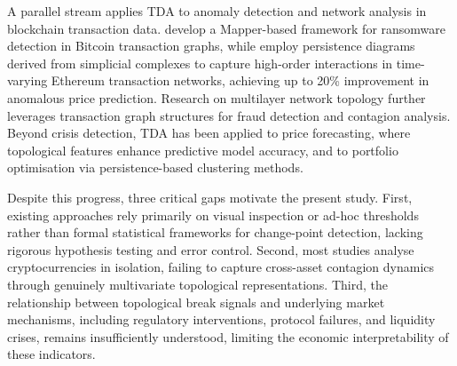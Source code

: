 \documentclass[11pt,reqno]{amsart}
\numberwithin{equation}{section} %
\begin{document}
A parallel stream applies TDA to anomaly detection and network analysis in blockchain transaction data. 
\citet{akcora2019bitcoinheist} develop a Mapper-based framework for ransomware detection in Bitcoin transaction graphs, while \citet{islambekov2024topological} employ persistence diagrams derived from simplicial complexes to capture high-order interactions in time-varying Ethereum transaction networks, achieving up to 20\% improvement in anomalous price prediction. 
Research on multilayer network topology further leverages transaction graph structures for fraud detection and contagion analysis\cite{li2020dissecting, ofori2021topological}.
Beyond crisis detection, TDA has been applied to price forecasting, where topological features enhance predictive model accuracy\cite{hafez2022ethereum,de2025enhancing}, and to portfolio optimisation via persistence-based clustering methods\cite{rivera2019topological}.

Despite this progress, three critical gaps motivate the present study. 
First, existing approaches rely primarily on visual inspection or ad-hoc thresholds rather than formal statistical frameworks for change-point detection, lacking rigorous hypothesis testing and error control. 
Second, most studies analyse cryptocurrencies in isolation, failing to capture cross-asset contagion dynamics through genuinely multivariate topological representations. 
Third, the relationship between topological break signals and underlying market mechanisms, including regulatory interventions, protocol failures, and liquidity crises, remains insufficiently understood, limiting the economic interpretability of these indicators.
\end{document}
